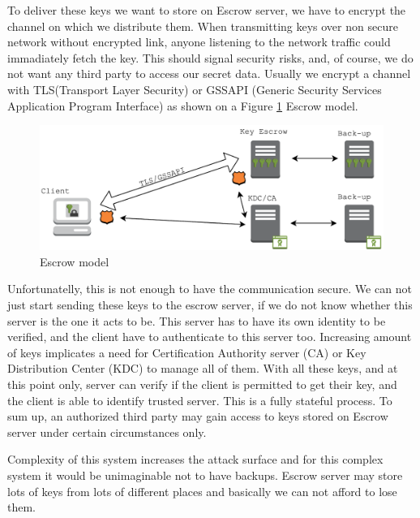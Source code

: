 To deliver these keys we want to store on Escrow server, we have to encrypt the channel on which we distribute them.
When transmitting keys over non secure network without encrypted link, anyone listening to the network traffic could immadiately fetch the key.
This should signal security risks, and, of course, we do not want any third party to access our secret data.
Usually we encrypt a channel with TLS(Transport Layer Security) or GSSAPI (Generic Security Services Application Program Interface) as shown on a Figure \ref{fig:escrowmodel} Escrow model.
\begin{figure}[h]
    \centering
    \includegraphics[scale=0.7]{figures/EscrowModel.pdf}
    \caption{Escrow model}
    \label{fig:escrowmodel}
\end{figure}
Unfortunatelly, this is not enough to have the communication secure.
We can not just start sending these keys to the escrow server, if we do not know whether this server is the one it acts to be.
This server has to have its own identity to be verified, and the client have to authenticate to this server too.
Increasing amount of keys implicates a need for Certification Authority server (CA) or Key Distribution Center (KDC) to manage all of them.
With all these keys, and at this point only, server can verify if the client is permitted to get their key, and the client is able to identify trusted server.
This is a fully stateful process.
To sum up, an authorized third party may gain access to keys stored on Escrow server under certain circumstances only.

Complexity of this system increases the attack surface and for this complex system it would be unimaginable not to have backups.
Escrow server may store lots of keys from lots of different places and basically we can not afford to lose them.
